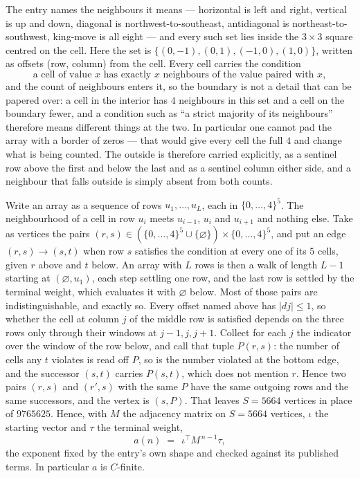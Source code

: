 \documentclass[11pt,a4paper]{article}
\theoremstyle{plain}
\theoremstyle{definition}
\begin{document}
The entry names the neighbours it means --- horizontal is left and right, vertical is up and
down, diagonal is northwest-to-southeast, antidiagonal is northeast-to-southwest, king-move is
all eight --- and every such set lies inside the $3\times3$ square centred on the cell. Here
the set is $\{(0,-1), (0,1), (-1,0), (1,0)\}$, written as offsets (row, column) from the cell. Every cell carries
the condition
\[
\text{a cell of value }x\text{ has exactly }x\text{ neighbours of the value paired with }x,
\]
and the count of neighbours enters it, so the boundary is not a detail that can be papered
over: a cell in the interior has $4$ neighbours in this set and a cell on the boundary
fewer, and a condition such as ``a strict majority of its neighbours'' therefore means
different things at the two. In particular one cannot pad the array with a border of zeros ---
that would give every cell the full $4$ and change what is being counted. The outside is
therefore carried
explicitly, as a sentinel row above the first and below the last and as a sentinel column
either side, and a neighbour that falls outside is simply absent from both counts.

Write an array as a sequence of rows $u_1,\dots,u_L$, each in
$\{0,\dots,4\}^{5}$. The neighbourhood of a cell in row $u_i$ meets $u_{i-1}$,
$u_i$ and $u_{i+1}$ and nothing else. Take as vertices the pairs
$(r,s)\in(\{0,\dots,4\}^{5}\cup\{\varnothing\})\times\{0,\dots,4\}^{5}$,
and put an edge $(r,s)\to(s,t)$ when row $s$ satisfies the condition at every one of its
$5$ cells, given $r$ above and $t$ below. An array with $L$ rows is then a walk of length
$L-1$ starting at $(\varnothing,u_1)$, each step settling one row, and the last row is
settled by the terminal weight, which evaluates it with $\varnothing$ below. Most of those pairs are indistinguishable, and exactly so. Every offset named above has $|dj|\le 1$, so whether the cell at column $j$ of the middle row is satisfied depends on the three rows only through their windows at $j-1,j,j+1$. Collect for each $j$ the indicator over the window of the row below, and call that tuple $P(r,s)$: the number of cells any $t$ violates is read off $P$, so is the number violated at the bottom edge, and the successor $(s,t)$ carries $P(s,t)$, which does not mention $r$. Hence two pairs $(r,s)$ and $(r',s)$ with the same $P$ have the same outgoing rows and the same successors, and the vertex is $(s,P)$. That leaves $S=5664$ vertices in place of $9765625$. Hence,
with $M$ the adjacency matrix on $S=5664$ vertices, $\iota$ the starting vector and $\tau$ the
terminal weight,
\[
a(n)\;=\;\,\iota^{\!\top}M^{\,n-1}\tau ,
\]
the exponent fixed by the entry's own shape and checked against its published terms. In
particular $a$ is $C$-finite.
\end{document}
